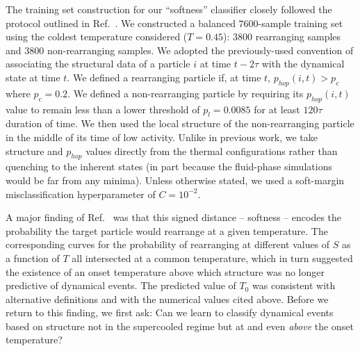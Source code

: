 \documentclass[aps,reprint,superscriptaddress,nofootinbib, notitlepage,prl]{revtex4-2}
\begin{document}
The training set construction for our ``softness'' classifier closely followed the protocol outlined in Ref.~\cite{schoenholz2016structural}. We constructed a balanced $7600$-sample training set using the coldest temperature considered ($T = 0.45$): $3800$ rearranging samples and $3800$ non-rearranging samples. We adopted the previously-used convention of associating the structural data of a particle $i$ at time $t - 2\tau$ with the dynamical state at time $t$. We defined a rearranging particle if, at time $t$,  $p_{hop}(i,t) > p_{c}$ where $p_c =0.2$. We defined a non-rearranging particle by requiring its $p_{hop}(i,t)$ value to remain less than a lower threshold of $p_{l}=0.0085$ for at least $120\tau$ duration of time. We then used the local structure of the non-rearranging particle in the middle of its time of low activity. Unlike in previous work, we take structure and $p_{hop}$ values directly from the thermal configurations rather than quenching to the inherent states (in part because the fluid-phase simulations would be far from any minima). Unless otherwise stated, we used a soft-margin misclassification hyperparameter of $C=10^{-2}$.


A major finding of Ref.~\cite{schoenholz2016structural} was that this signed distance -- softness -- encodes the probability the target particle would rearrange at a given temperature. The corresponding curves for the probability of rearranging at different values of $S$ as a function of $T$ all intersected at a common temperature, which in turn suggested the existence of an onset temperature above which structure was no longer predictive of dynamical events. The predicted value of $T_0$ was consistent with alternative definitions \cite{debenedetti2001supercooled,keys2011excitations,schoenholz2016structural} and with the numerical values cited above. Before we return to this finding, we first ask: Can we learn to classify dynamical events based on structure not in the supercooled regime but at and even \emph{above} the onset temperature?
\end{document}
